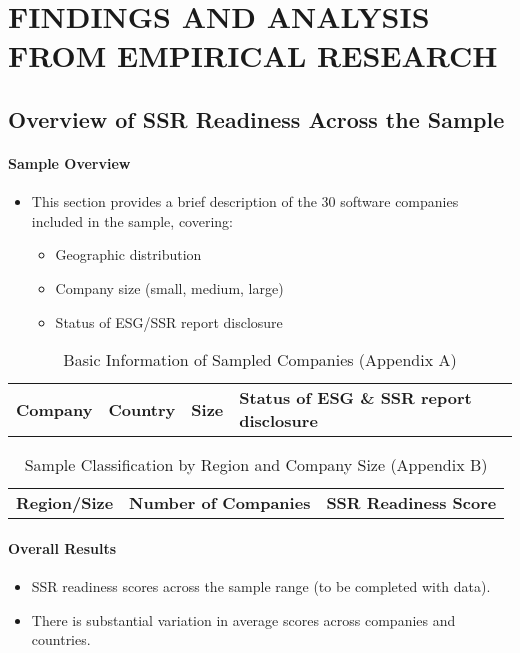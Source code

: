 \chapter{FINDINGS AND ANALYSIS FROM EMPIRICAL RESEARCH}

\section{Overview of SSR Readiness Across the Sample}
\subsubsection{Sample Overview}
\begin{itemize}
    \item This section provides a brief description of the 30 software companies included in the sample, covering:
    \begin{itemize}
        \item Geographic distribution
        \item Company size (small, medium, large)
        \item Status of ESG/SSR report disclosure
    \end{itemize}
\end{itemize}

\begin{table}[H]
    \centering
    \caption{Basic Information of Sampled Companies (Appendix A)} 
    \begin{tabular}{l l l l}
        \textbf{Company} & \textbf{Country} & \textbf{Size} & \textbf{Status of ESG \& SSR report disclosure} \\    
    \end{tabular}
\end{table}

\begin{table}[H]
    \centering
    \caption{Sample Classification by Region and Company Size (Appendix B)} 
    
    \begin{tabular}{l l l}
        \textbf{Region/Size} & \textbf{Number of Companies} & \textbf{SSR Readiness Score} \\
    \end{tabular}
\end{table}

\subsubsection{Overall Results}
\begin{itemize}
    \item SSR readiness scores across the sample range (to be completed with data). 
    \item There is substantial variation in average scores across companies and countries.
\end{itemize}

